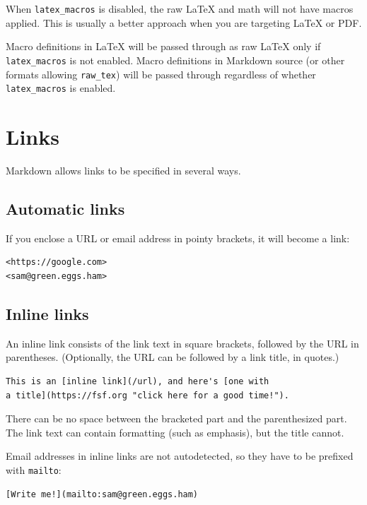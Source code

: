 \documentclass[
  b5paper
]{book}
\begin{document}
When \texttt{latex\_macros} is disabled, the raw LaTeX and math will not
have macros applied. This is usually a better approach when you are
targeting LaTeX or PDF.

Macro definitions in LaTeX will be passed through as raw LaTeX only if
\texttt{latex\_macros} is not enabled. Macro definitions in Markdown
source (or other formats allowing \texttt{raw\_tex}) will be passed
through regardless of whether \texttt{latex\_macros} is enabled.

\section{Links}\label{links-1}

Markdown allows links to be specified in several ways.

\subsection{Automatic links}\label{automatic-links}

If you enclose a URL or email address in pointy brackets, it will become
a link:

\begin{verbatim}
<https://google.com>
<sam@green.eggs.ham>
\end{verbatim}

\subsection{Inline links}\label{inline-links}

An inline link consists of the link text in square brackets, followed by
the URL in parentheses. (Optionally, the URL can be followed by a link
title, in quotes.)

\begin{verbatim}
This is an [inline link](/url), and here's [one with
a title](https://fsf.org "click here for a good time!").
\end{verbatim}

There can be no space between the bracketed part and the parenthesized
part. The link text can contain formatting (such as emphasis), but the
title cannot.

Email addresses in inline links are not autodetected, so they have to be
prefixed with \texttt{mailto}:

\begin{verbatim}
[Write me!](mailto:sam@green.eggs.ham)
\end{verbatim}
\end{document}
